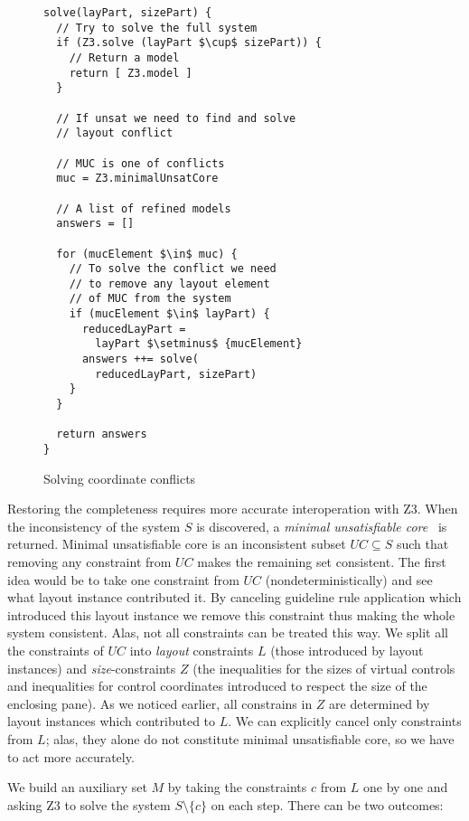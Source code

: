 \begin{figure}
\begin{lstlisting}[language=algo,mathescape=true,basicstyle=\ttfamily]
solve(layPart, sizePart) {
  // Try to solve the full system
  if (Z3.solve (layPart $\cup$ sizePart)) {
    // Return a model
    return [ Z3.model ]
  }

  // If unsat we need to find and solve
  // layout conflict

  // MUC is one of conflicts
  muc = Z3.minimalUnsatCore

  // A list of refined models
  answers = []

  for (mucElement $\in$ muc) {
    // To solve the conflict we need
    // to remove any layout element
    // of MUC from the system
    if (mucElement $\in$ layPart) {
      reducedLayPart =
        layPart $\setminus$ {mucElement}
      answers ++= solve(
        reducedLayPart, sizePart)
    }
  }

  return answers
}
\end{lstlisting}
\caption{Solving coordinate conflicts}
\label{Z3op}
\end{figure}

Restoring the completeness requires more accurate interoperation with \textsc{Z3}.
When the inconsistency of the system $S$ is discovered, a \emph{minimal unsatisfiable core}~\cite{minUnsatCore} is returned.
Minimal unsatisfiable core is an inconsistent subset $UC\subseteq S$ such that removing any constraint from $UC$ makes the remaining set consistent.
The first idea would be to take one constraint from $UC$ (nondeterministically) and see what layout instance contributed it.
By canceling guideline rule application which introduced this
layout instance we remove this constraint thus making the whole system consistent.
Alas, not all constraints can be treated this way.
We split all the constraints of $UC$ into \emph{layout} constraints $L$ (those
introduced by layout instances) and \emph{size}-constraints $Z$ (the inequalities for the sizes of virtual controls and
inequalities for control coordinates introduced to respect the size of the enclosing pane).
As we noticed earlier,
all constrains in $Z$ are determined by layout instances which contributed to $L$.
We can explicitly cancel only constraints from $L$; alas, they alone do not constitute minimal unsatisfiable core, so we have to act more accurately.

We build an auxiliary set $M$ by taking the constraints $c$ from $L$ one by one and asking \textsc{Z3} to solve the system $S\setminus\{c\}$ on each step.
There can be two outcomes:

